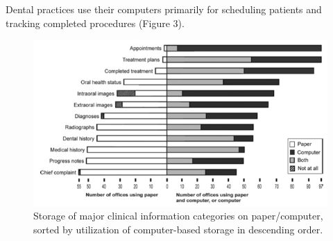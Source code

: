 \documentclass[11pt]{article}
\begin{document}
Dental practices use their computers primarily for scheduling patients and tracking completed procedures (Figure 3).\label{fig:3}
\begin{figure}[!t]
\begin{center}
\includegraphics[width=\textwidth]{papervscomp.jpg}
\end{center}
\caption{Storage of major clinical information categories on paper/computer, sorted by utilization of computer-based storage in descending order\cite{Schleyer2007A-Qualitative-I}.}
\end{figure}
\end{document}
